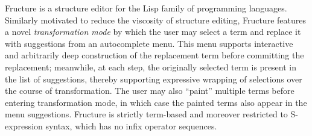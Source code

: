 





Fructure is a structure editor for the Lisp family of
programming languages.
Similarly motivated to reduce the viscosity of structure
editing, Fructure features a novel \emph{transformation mode}
by which the user may select a term
and replace it with suggestions from an autocomplete menu.
This menu supports interactive and arbitrarily deep
construction of the replacement term before committing
the replacement; meanwhile, at each
step, the originally selected term is present in the
list of suggestions, thereby supporting expressive
wrapping of selections over the course of transformation.
The user may also ``paint'' multiple terms before
entering transformation mode, in which case the painted
terms also appear in the menu suggestions.
Fructure is strictly term-based and moreover restricted
to S-expression syntax, which has no infix operator sequences.

